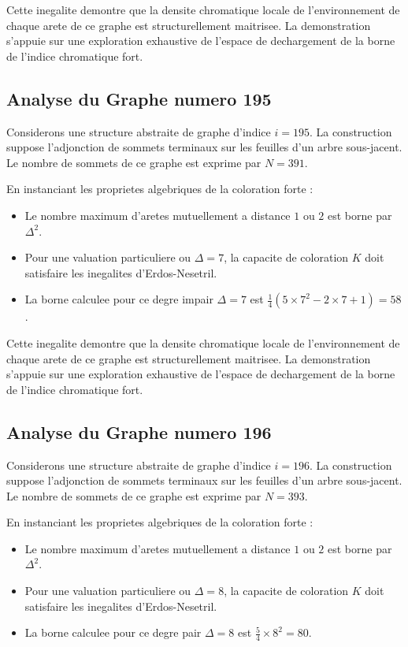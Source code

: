 \documentclass[11pt,a4paper]{article}
\begin{document}
Cette inegalite demontre que la densite chromatique locale de l'environnement de chaque arete de ce graphe est structurellement maitrisee. La demonstration s'appuie sur une exploration exhaustive de l'espace de dechargement de la borne de l'indice chromatique fort.

\subsection{Analyse du Graphe numero 195}
Considerons une structure abstraite de graphe d'indice $i = 195$. La construction suppose l'adjonction de sommets terminaux sur les feuilles d'un arbre sous-jacent. Le nombre de sommets de ce graphe est exprime par $N = 391$.

En instanciant les proprietes algebriques de la coloration forte :
\begin{itemize}
\item Le nombre maximum d'aretes mutuellement a distance $1$ ou $2$ est borne par $\Delta^2$.
\item Pour une valuation particuliere ou $\Delta = 7$, la capacite de coloration $K$ doit satisfaire les inegalites d'Erdos-Nesetril.
\item La borne calculee pour ce degre impair $\Delta = 7$ est $\frac{1}{4}(5 \times 7^2 - 2 \times 7 + 1) = 58$.
\end{itemize}

Cette inegalite demontre que la densite chromatique locale de l'environnement de chaque arete de ce graphe est structurellement maitrisee. La demonstration s'appuie sur une exploration exhaustive de l'espace de dechargement de la borne de l'indice chromatique fort.

\subsection{Analyse du Graphe numero 196}
Considerons une structure abstraite de graphe d'indice $i = 196$. La construction suppose l'adjonction de sommets terminaux sur les feuilles d'un arbre sous-jacent. Le nombre de sommets de ce graphe est exprime par $N = 393$.

En instanciant les proprietes algebriques de la coloration forte :
\begin{itemize}
\item Le nombre maximum d'aretes mutuellement a distance $1$ ou $2$ est borne par $\Delta^2$.
\item Pour une valuation particuliere ou $\Delta = 8$, la capacite de coloration $K$ doit satisfaire les inegalites d'Erdos-Nesetril.
\item La borne calculee pour ce degre pair $\Delta = 8$ est $\frac{5}{4} \times 8^2 = 80$.
\end{itemize}
\end{document}
